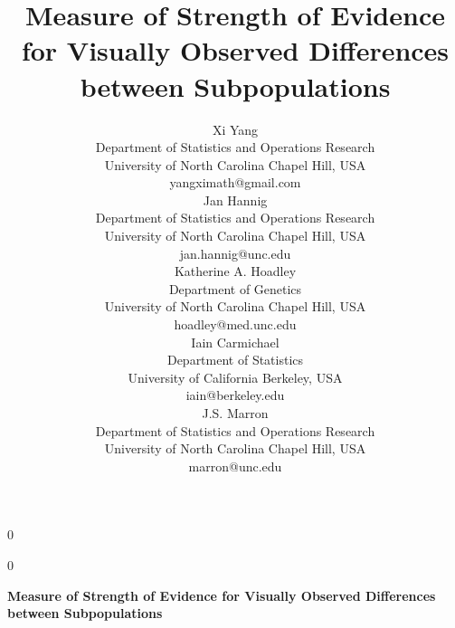\documentclass[12pt]{article}
\newcommand{\blind}{0}
\begin{document}
%

\def\spacingset#1{\renewcommand{\baselinestretch}%
{#1}\small\normalsize} \spacingset{2}



\blind{ 
\title{\bf Measure of Strength of Evidence for Visually Observed Differences between Subpopulations}
  \author{Xi Yang\\
  Department of Statistics and Operations Research\\
University of North Carolina
Chapel Hill, USA\\
yangximath@gmail.com
\\
    Jan Hannig \\
    Department of Statistics and Operations Research\\
University of North Carolina
Chapel Hill, USA\\
jan.hannig@unc.edu
\\
Katherine A. Hoadley \\
    Department of Genetics\\
University of North Carolina
Chapel Hill, USA\\
hoadley@med.unc.edu\\
Iain Carmichael\\
Department of Statistics\\ University of California  Berkeley, USA\\
iain@berkeley.edu\\
J.S. Marron\\
    Department of Statistics and Operations Research\\
University of North Carolina
Chapel Hill, USA\\
marron@unc.edu}
  \maketitle
}\fi
{}\blind{
  \bigskip
  \bigskip
  \bigskip
  \begin{center}
    {\LARGE\bf Measure of Strength of Evidence for Visually Observed Differences between Subpopulations}
\end{center}
  \medskip
}\fi
\end{document}

